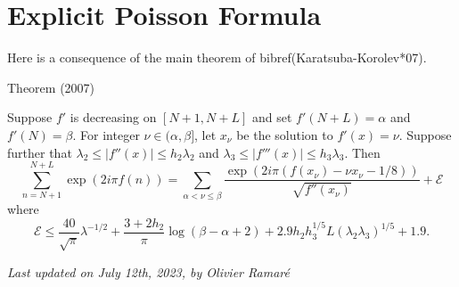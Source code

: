 \par 
\section{Explicit Poisson Formula}


Here is a consequence of the main theorem of
bibref(Karatsuba-Korolev*07).
\par 
\begin{thm}{Theorem (2007)}

    Suppose $f'$ is decreasing on $[N+1,N+L]$ and set
    $f'(N+L)=\alpha$ and $f'(N)=\beta$.
    For integer $\nu\in(\alpha, \beta]$, let $x_\nu$ be the solution
    to $f'(x)=\nu$. Suppose further that
$\lambda_2\le |f''(x)|\le h_2\lambda_2$ and
    $\lambda_3\le |f'''(x)|\le h_3\lambda_3$. Then
    $$
    \sum_{n=N+1}^{N+L} \exp(2i\pi f(n))
    =
    \sum_{\alpha < \nu\le \beta}
		   \frac{\exp(2i\pi (f(x_\nu)-\nu x_\nu-1/8))}{\sqrt{f''(x_\nu)}}
		   +\mathcal{E}
    $$
		   where
		   $$
		   \mathcal{E}
		   \le \frac{40}{\sqrt{\pi}}\lambda^{-1/2}
		   + \frac{3+2h_2}{\pi} \log(\beta-\alpha+2)
		   + 2.9 h_2h_3^{1/5}L(\lambda_2\lambda_3)^{1/5}
		   +1.9.
		   $$
		   
\end{thm}








  
\begin{flushright}\small\sl{}   Last updated on July 12th, 2023, by Olivier Ramar\'e
 \end{flushright}















